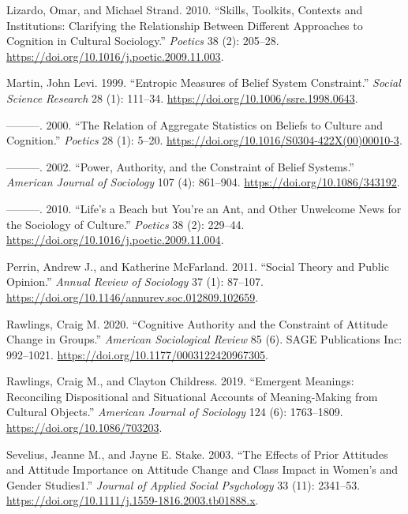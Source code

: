 \documentclass[12pt,]{article}
\begin{document}
\leavevmode\hypertarget{ref-lizardo2010a}{}%
Lizardo, Omar, and Michael Strand. 2010. ``Skills, Toolkits, Contexts and Institutions: Clarifying the Relationship Between Different Approaches to Cognition in Cultural Sociology.'' \emph{Poetics} 38 (2): 205--28. \url{https://doi.org/10.1016/j.poetic.2009.11.003}.

\leavevmode\hypertarget{ref-martin1999}{}%
Martin, John Levi. 1999. ``Entropic Measures of Belief System Constraint.'' \emph{Social Science Research} 28 (1): 111--34. \url{https://doi.org/10.1006/ssre.1998.0643}.

\leavevmode\hypertarget{ref-martin2000a}{}%
---------. 2000. ``The Relation of Aggregate Statistics on Beliefs to Culture and Cognition.'' \emph{Poetics} 28 (1): 5--20. \url{https://doi.org/10.1016/S0304-422X(00)00010-3}.

\leavevmode\hypertarget{ref-martin2002}{}%
---------. 2002. ``Power, Authority, and the Constraint of Belief Systems.'' \emph{American Journal of Sociology} 107 (4): 861--904. \url{https://doi.org/10.1086/343192}.

\leavevmode\hypertarget{ref-martin2010}{}%
---------. 2010. ``Life's a Beach but You're an Ant, and Other Unwelcome News for the Sociology of Culture.'' \emph{Poetics} 38 (2): 229--44. \url{https://doi.org/10.1016/j.poetic.2009.11.004}.

\leavevmode\hypertarget{ref-perrin2011}{}%
Perrin, Andrew J., and Katherine McFarland. 2011. ``Social Theory and Public Opinion.'' \emph{Annual Review of Sociology} 37 (1): 87--107. \url{https://doi.org/10.1146/annurev.soc.012809.102659}.

\leavevmode\hypertarget{ref-rawlings2020}{}%
Rawlings, Craig M. 2020. ``Cognitive Authority and the Constraint of Attitude Change in Groups.'' \emph{American Sociological Review} 85 (6). SAGE Publications Inc: 992--1021. \url{https://doi.org/10.1177/0003122420967305}.

\leavevmode\hypertarget{ref-rawlings2019}{}%
Rawlings, Craig M., and Clayton Childress. 2019. ``Emergent Meanings: Reconciling Dispositional and Situational Accounts of Meaning-Making from Cultural Objects.'' \emph{American Journal of Sociology} 124 (6): 1763--1809. \url{https://doi.org/10.1086/703203}.

\leavevmode\hypertarget{ref-sevelius2003}{}%
Sevelius, Jeanne M., and Jayne E. Stake. 2003. ``The Effects of Prior Attitudes and Attitude Importance on Attitude Change and Class Impact in Women's and Gender Studies1.'' \emph{Journal of Applied Social Psychology} 33 (11): 2341--53. \url{https://doi.org/10.1111/j.1559-1816.2003.tb01888.x}.
\end{document}
